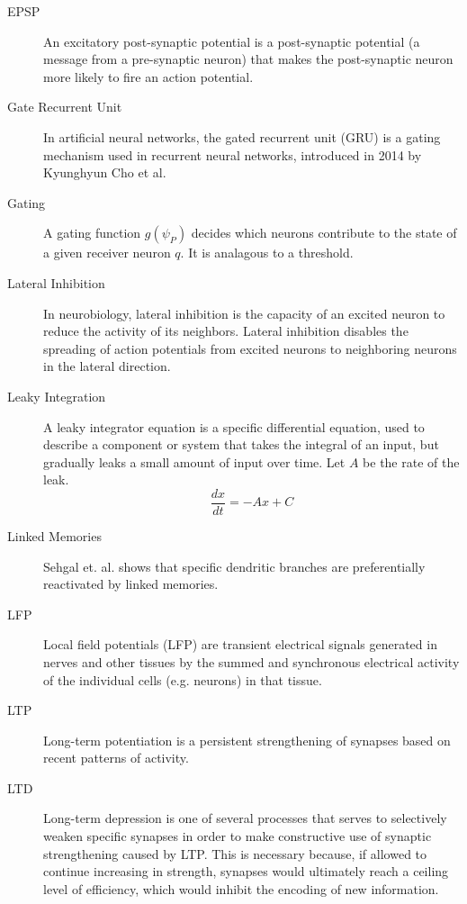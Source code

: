 \documentclass[11pt, a4paper]{article}
\begin{document}
\begin{description}
    \item[EPSP] An excitatory post-synaptic potential is a post-synaptic potential (a message from a pre-synaptic neuron) that makes the post-synaptic neuron more likely to fire an action potential.

    \item[Gate Recurrent Unit] In artificial neural networks, the gated recurrent unit (GRU) is a gating mechanism used in recurrent neural networks, introduced in 2014 by Kyunghyun Cho et al.
    
    \item[Gating] A gating function $g(\psi_P)$ decides which neurons contribute to the state of a given receiver neuron $q$. It is analagous to a threshold.

    \item[Lateral Inhibition] In neurobiology, lateral inhibition is the capacity of an excited neuron to reduce the activity of its neighbors. Lateral inhibition disables the spreading of action potentials from excited neurons to neighboring neurons in the lateral direction.

    \item[Leaky Integration]  A leaky integrator equation is a specific differential equation, used to describe a component or system that takes the integral of an input, but gradually leaks a small amount of input over time. Let $A$ be the rate of the leak.
    \begin{equation}
    \frac{dx}{dt} = -Ax +C
    \end{equation}

    \item[Linked Memories] Sehgal et. al. shows that specific dendritic branches are preferentially reactivated by linked memories.

    \item[LFP] Local field potentials (LFP) are transient electrical signals generated in nerves and other tissues by the summed and synchronous electrical activity of the individual cells (e.g. neurons) in that tissue. 

    \item[LTP] Long-term potentiation is a persistent strengthening of synapses based on recent patterns of activity.

    \item[LTD] Long-term depression is one of several processes that serves to selectively weaken specific synapses in order to make constructive use of synaptic strengthening caused by LTP. This is necessary because, if allowed to continue increasing in strength, synapses would ultimately reach a ceiling level of efficiency, which would inhibit the encoding of new information.


\end{description}
\end{document}
